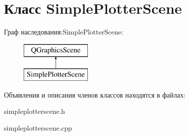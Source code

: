 \hypertarget{class_simple_plotter_scene}{}\section{Класс Simple\+Plotter\+Scene}
\label{class_simple_plotter_scene}
Граф наследования\+:Simple\+Plotter\+Scene\+:\begin{figure}[H]
\begin{center}
\leavevmode
\includegraphics[height=2.000000cm]{class_simple_plotter_scene}
\end{center}
\end{figure}


Объявления и описания членов классов находятся в файлах\+:\begin{DoxyCompactItemize}
\item 
simpleplotterscene.\+h\item 
simpleplotterscene.\+cpp\end{DoxyCompactItemize}
